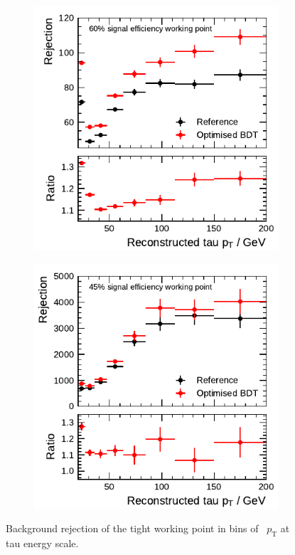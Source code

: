 \begin{figure}[htbp]
  \centering
  \begin{subfigure}[t]{0.48\textwidth}
    \centering
    \includegraphics{./figures/bdt_perf/post_optimisation/rejection_tight_1p.pdf}
  \end{subfigure}\hfill
  \begin{subfigure}[t]{0.48\textwidth}
    \centering
    \includegraphics{./figures/bdt_perf/post_optimisation/rejection_tight_3p.pdf}
  \end{subfigure}
  \caption[Background rejection of the tight working point in bins of
  \tauhadvis~\pt for the BDT-based identification]{Background rejection of the
    tight working point in bins of \tauhadvis~$p_\text{T}$ at tau energy scale.}
  \label{fig:rejection_comparison}
\end{figure}

